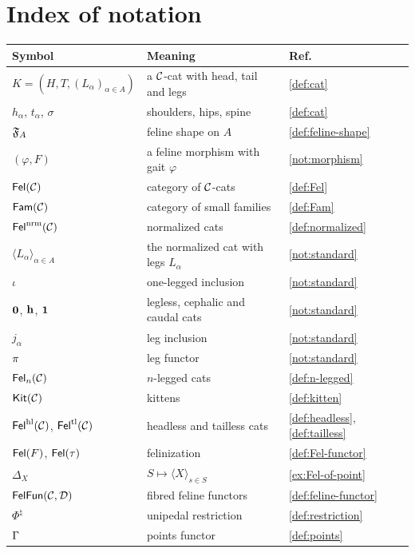 \chapter{Index of notation}\label{app:notation}

{\small
\renewcommand{\arraystretch}{1.2}
\begin{longtable}{p{}p{}p{}}
\textbf{Symbol} & \textbf{Meaning} & \textbf{Ref.}\\
\hline
\endhead
$K=(H,T,(L_\alpha)_{\alpha\in A})$ & a $\mathcal{C}$-cat with head, tail and legs & \ref{def:cat}\\
$h_\alpha$, $t_\alpha$, $\sigma$ & shoulders, hips, spine & \ref{def:cat}\\
$\mathfrak{F}_A$ & feline shape on $A$ & \ref{def:feline-shape}\\
$(\varphi,F)$ & a feline morphism with gait $\varphi$ & \ref{not:morphism}\\
$\mathsf{Fel}(\mathcal{C})$ & category of $\mathcal{C}$-cats & \ref{def:Fel}\\
$\mathsf{Fam}(\mathcal{C})$ & category of small families & \ref{def:Fam}\\
$\mathsf{Fel}^{\mathrm{nrm}}(\mathcal{C})$ & normalized cats & \ref{def:normalized}\\
$\langle L_\alpha\rangle_{\alpha\in A}$ & the normalized cat with legs $L_\alpha$ & \ref{not:standard}\\
$\iota$ & one-legged inclusion & \ref{not:standard}\\
$\mathbf{0}$, $\mathbf{h}$, $\mathbf{1}$ & legless, cephalic and caudal cats & \ref{not:standard}\\
$j_\alpha$ & leg inclusion & \ref{not:standard}\\
$\pi$ & leg functor & \ref{not:standard}\\
$\mathsf{Fel}_n(\mathcal{C})$ & $n$-legged cats & \ref{def:n-legged}\\
$\mathsf{Kit}(\mathcal{C})$ & kittens & \ref{def:kitten}\\
$\mathsf{Fel}^{\mathrm{hl}}(\mathcal{C})$, $\mathsf{Fel}^{\mathrm{tl}}(\mathcal{C})$ & headless and tailless cats & \ref{def:headless}, \ref{def:tailless}\\
$\mathsf{Fel}(F)$, $\mathsf{Fel}(\tau)$ & felinization & \ref{def:Fel-functor}\\
$\Delta_X$ & $S\mapsto\langle X\rangle_{s\in S}$ & \ref{ex:Fel-of-point}\\
$\mathsf{FelFun}(\mathcal{C},\mathcal{D})$ & fibred feline functors & \ref{def:feline-functor}\\
$\Phi^\natural$ & unipedal restriction & \ref{def:restriction}\\
$\Gamma$ & points functor & \ref{def:points}\\

\end{longtable}}
